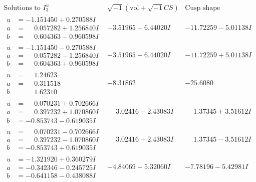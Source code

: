 \documentclass[1p]{elsarticle_modified}
\theoremstyle{definition}
\newcommand{\I}{\sqrt{-1}}
\begin{document}
$$\begin{array}{c|c|c}  
\text{Solutions to }I^u_{3}& \I (\text{vol} + \sqrt{-1}CS) & \text{Cusp shape}\\
 \hline 
\begin{aligned}
u &= -1.151450 + 0.270588 I \\
a &= \phantom{-}0.057282 + 1.256840 I \\
b &= \phantom{-}0.604363 - 0.960598 I\end{aligned}
 & -3.51965 + 6.44020 I & -11.72259 - 5.01138 I \\ \hline\begin{aligned}
u &= -1.151450 - 0.270588 I \\
a &= \phantom{-}0.057282 - 1.256840 I \\
b &= \phantom{-}0.604363 + 0.960598 I\end{aligned}
 & -3.51965 - 6.44020 I & -11.72259 + 5.01138 I \\ \hline\begin{aligned}
u &= \phantom{-}1.24623\phantom{ +0.000000I} \\
a &= \phantom{-}0.311518\phantom{ +0.000000I} \\
b &= \phantom{-}1.62310\phantom{ +0.000000I}\end{aligned}
 & -8.31862\phantom{ +0.000000I} & -25.6080\phantom{ +0.000000I} \\ \hline\begin{aligned}
u &= \phantom{-}0.070231 + 0.702666 I \\
a &= \phantom{-}0.397232 + 1.070860 I \\
b &= -0.853743 - 0.619035 I\end{aligned}
 & \phantom{-}3.02416 - 2.43083 I & \phantom{-}1.37345 + 3.51612 I \\ \hline\begin{aligned}
u &= \phantom{-}0.070231 - 0.702666 I \\
a &= \phantom{-}0.397232 - 1.070860 I \\
b &= -0.853743 + 0.619035 I\end{aligned}
 & \phantom{-}3.02416 + 2.43083 I & \phantom{-}1.37345 - 3.51612 I \\ \hline\begin{aligned}
u &= -1.321920 + 0.360279 I \\
a &= -0.342346 - 0.245725 I \\
b &= -0.641158 - 0.438088 I\end{aligned}
 & -4.84069 + 5.32060 I & -7.78196 - 5.42981 I \\ \hline\begin{aligned}

\end{aligned}
\end{array}$$
\end{document}
